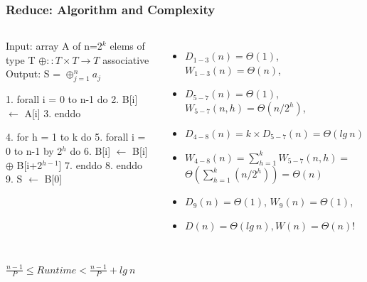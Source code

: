 \documentclass{beamer}
\renewcommand{\emph}[1]{\textcolor{structure}{#1}}
\newcommand{\emp}[1]{\textcolor{DikuRed}{ #1}}
\newcommand{\mymath}[1]{$ #1 $}
\newcommand{\myindx}[1]{_{#1}}
\newcommand{\myindu}[1]{^{#1}}
\begin{document}
\begin{frame}[fragile,t]
  \frametitle{Reduce: Algorithm and Complexity}


\begin{columns}
\begin{colorcode}[fontsize=\scriptsize]
Input:  array A of n=2\mymath{\myindu{k}} elems of type T
        \mymath{\oplus::T\times T\rightarrow T} associative
Output: S = \mymath{\oplus\myindx{j=1}\myindu{n} a\myindx{j}}

1.  \emph{forall i = 0 to n-1 do}
2.    B[i] \mymath{\leftarrow} A[i]
3.  \emph{enddo}

4.  \emp{for h = 1 to k do}
5.    \emph{forall i = 0 to n-1 by 2\mymath{\myindu{h}} do} 
6.      B[i] \mymath{\leftarrow} B[i] \mymath{\oplus} B[i+2\mymath{\myindu{h-1}}]
7.    \emph{enddo}
8.  \emp{enddo}
9.  S \mymath{\leftarrow} B[0]  
\end{colorcode}
\begin{itemize}
    \item $D_{1-3}(n) = \Theta(1)$, $W_{1-3}(n) = \Theta(n)$,
    \item $D_{5-7}(n) = \Theta(1)$, $W_{5-7}(n,h) = \Theta(n/2^h)$,
    \item $D_{4-8}(n) = k \times D_{5-7}(n) = \Theta(lg \ n)$
    \item $W_{4-8}(n) = \sum_{h=1}^k W_{5-7}(n,h) = $\\
          $\Theta(\sum_{h=1}^k (n/2^h) ) = \Theta(n)$
    \item $D_{9}(n) = \Theta(1)$, $W_{9}(n) = \Theta(1)$,\bigskip
    \item \emp{$D(n) = \Theta(lg \ n), W(n) = \Theta(n)$!}
\end{itemize}
\end{columns}
\bigskip


\begin{center}  
\emp{$\frac{n-1}{P} \leq  Runtime < \frac{n-1}{P} + lg \ n$}
\end{center}


\end{frame}
\end{document}
